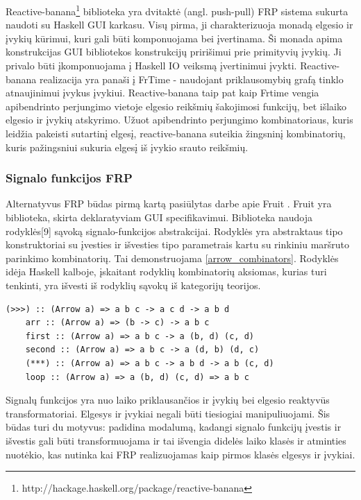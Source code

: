 Reactive-banana\footnote{http://hackage.haskell.org/package/reactive-banana} biblioteka yra dvitaktė (angl. push-pull) FRP sistema sukurta naudoti su Haskell GUI karkasu. Visų pirma, ji charakterizuoja monadą elgesio ir įvykių kūrimui, kuri gali būti komponuojama bei įvertinama. Ši monada apima konstrukcijas GUI bibliotekos konstrukcijų pririšimui prie primityvių įvykių. Ji privalo būti įkomponuojama į Haskell IO veiksmą įvertinimui įvykti. Reactive-banana realizacija yra panaši į FrTime - naudojant priklausomybių grafą tinklo atnaujinimui įvykus įvykiui. Reactive-banana taip pat kaip Frtime vengia apibendrinto perjungimo vietoje elgesio reikšmių šakojimosi funkcijų, bet išlaiko elgesio ir įvykių atskyrimo. Užuot apibendrinto perjungimo kombinatoriaus, kuris leidžia pakeisti sutartinį elgesį, reactive-banana suteikia žingsninį kombinatorių, kuris pažingsniui sukuria elgesį iš įvykio srauto reikšmių.

\subsubsection{Signalo funkcijos FRP}

Alternatyvus FRP būdas pirmą kartą pasiūlytas darbe apie Fruit \cite{Courtney01genuinelyfunctional}. Fruit yra biblioteka, skirta deklaratyviam GUI specifikavimui. Biblioteka naudoja rodyklės[9] sąvoką signalo-funkcijos abstrakcijai. Rodyklės yra abstraktaus tipo konstruktoriai su įvesties ir išvesties tipo parametrais kartu su rinkiniu maršruto parinkimo kombinatorių. Tai demonstruojama \ref{arrow_combinators}. Rodyklės idėja Haskell kalboje, įskaitant rodyklių kombinatorių aksiomas, kurias turi tenkinti, yra išvesti iš rodyklių sąvokų iš kategorijų teorijos.

\begin{lstlisting}[caption=- rodyklių kombinatoriai, label=arrow_combinators]
	(>>>) :: (Arrow a) => a b c -> a c d -> a b d
	arr :: (Arrow a) => (b -> c) -> a b c
	first :: (Arrow a) => a b c -> a (b, d) (c, d)
	second :: (Arrow a) => a b c -> a (d, b) (d, c)
	(***) :: (Arrow a) => a b c -> a b d -> a b (c, d)
	loop :: (Arrow a) => a (b, d) (c, d) => a b c
\end{lstlisting} 

Signalų funkcijos yra nuo laiko priklausančios ir įvykių bei elgesio reaktyvūs transformatoriai. Elgesys ir įvykiai negali būti tiesiogiai manipuliuojami. Šis būdas turi du motyvus: padidina modalumą, kadangi signalo funkcijų įvestis ir išvestis gali būti transformuojama ir tai išvengia didelės laiko klasės ir atminties nuotėkio, kas nutinka kai FRP realizuojamas kaip pirmos klasės elgesys ir įvykiai.

